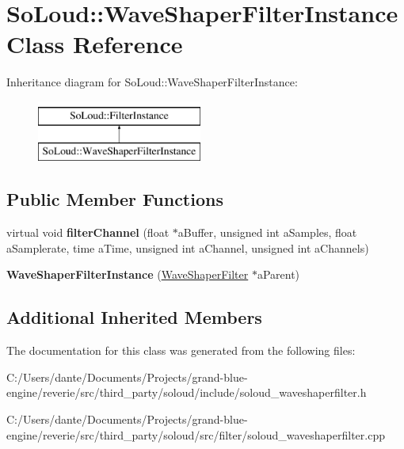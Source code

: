 \hypertarget{class_so_loud_1_1_wave_shaper_filter_instance}{}\section{So\+Loud\+::Wave\+Shaper\+Filter\+Instance Class Reference}
\label{class_so_loud_1_1_wave_shaper_filter_instance}
Inheritance diagram for So\+Loud\+::Wave\+Shaper\+Filter\+Instance\+:\begin{figure}[H]
\begin{center}
\leavevmode
\includegraphics[height=2.000000cm]{class_so_loud_1_1_wave_shaper_filter_instance}
\end{center}
\end{figure}
\subsection*{Public Member Functions}
\begin{DoxyCompactItemize}
\item 
\mbox{\label{class_so_loud_1_1_wave_shaper_filter_instance_ac174af60d6f9fd4721303151bb5a0ba1}} 
virtual void {\bfseries filter\+Channel} (float $\ast$a\+Buffer, unsigned int a\+Samples, float a\+Samplerate, time a\+Time, unsigned int a\+Channel, unsigned int a\+Channels)
\item 
\mbox{\label{class_so_loud_1_1_wave_shaper_filter_instance_af30d5055855c4fd9935bd58e12fc74eb}} 
{\bfseries Wave\+Shaper\+Filter\+Instance} (\mbox{\hyperlink{class_so_loud_1_1_wave_shaper_filter}{Wave\+Shaper\+Filter}} $\ast$a\+Parent)
\end{DoxyCompactItemize}
\subsection*{Additional Inherited Members}


The documentation for this class was generated from the following files\+:\begin{DoxyCompactItemize}
\item 
C\+:/\+Users/dante/\+Documents/\+Projects/grand-\/blue-\/engine/reverie/src/third\+\_\+party/soloud/include/soloud\+\_\+waveshaperfilter.\+h\item 
C\+:/\+Users/dante/\+Documents/\+Projects/grand-\/blue-\/engine/reverie/src/third\+\_\+party/soloud/src/filter/soloud\+\_\+waveshaperfilter.\+cpp\end{DoxyCompactItemize}
